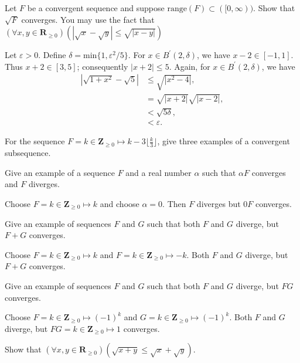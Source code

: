 \documentclass[12pt, fleqn]{exam}
\newcommand{\reals}{\mathbf{R}}
\newcommand{\integers}{\mathbf{Z}}
\newcommand{\range}{\mathrm{range}}
\begin{document}
\begin{questions}
\begin{solution}
\end{solution}

\question Let $F$ be a convergent sequence and suppose $\range(F) \subset([0,\infty))$. Show that $\sqrt{F}$ converges.
You may use the fact that $\left(\forall x,y \in \reals_{\geq 0}\right)  (| \sqrt{x} - \sqrt{y} | \leq \sqrt{|x - y|} )$

\begin{solution}
Let \(\varepsilon > 0\). Define \(\delta = \mbox{min}\{1, \varepsilon^2 / 5\}\). 
For \(x \in B^\prime(2, \delta)\), we
have \(x - 2 \in [-1,1]\). Thus \(x + 2 \in [3,5]\); consequently
\(|x+2| \leq 5\). Again, for \(x \in B^\prime(2, \delta)\), we have
\begin{align*}
  |\sqrt{1+x^2} - \sqrt{5} | &\leq \sqrt{|x^2 - 4|}, \\ 
                             &= \sqrt{|x + 2|} \sqrt{|x - 2|}, \\
                             &< \sqrt{5 \delta}, \\
                             &< \varepsilon.
\end{align*}
\end{solution}

\question For the sequence $F  = k \in \integers_{\geq 0} \mapsto k - 3 \lfloor \frac{k}{3} \rfloor $, give three examples of
a convergent subsequence.

\question Give an example of a sequence $F$ and a real number $\alpha$ such that $\alpha F$ converges and $F$ diverges.
\begin{solution} Choose $F = k \in \integers_{\geq 0} \mapsto k$ and choose $\alpha = 0$. Then $F$ diverges but $0F$ 
converges.
\end{solution}
 \question Give an example of sequences $F$ and $G$ such that both $F$ and $G$ diverge, but $F+ G$ converges.
 \begin{solution} Choose $F = k \in \integers_{\geq 0} \mapsto k$ and $F = k \in \integers_{\geq 0} \mapsto -k$.
 Both $F$ and $G$ diverge, but $F+G$ converges.
 \end{solution}
 
  \question Give an example of sequences $F$ and $G$ such that both $F$ and $G$ diverge, but $F G$ converges.
 \begin{solution} Choose $F = k \in \integers_{\geq 0} \mapsto (-1)^k$ and $G = k \in \integers_{\geq 0} \mapsto (-1)^k$.
 Both $F$ and $G$ diverge, but $F G =  k \in \integers_{\geq 0} \mapsto 1$ converges.
 \end{solution}
\question Show that $\left(\forall x,y \in \reals_{\geq 0}\right)(\sqrt{x+y} \leq \sqrt{x} +\sqrt{y})$.


\end{questions}
\end{document}
